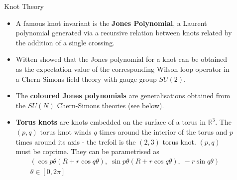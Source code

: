 \documentclass[final,10pt]{beamer}
\newlength{\sepwidth}
\newlength{\colwidth}
\newcommand{\separatorcolumn}{\begin{column}{\sepwidth}\end{column}}
\newcommand{\R}{\mathbb{R}}
\begin{document}
\begin{frame}[t]
\begin{columns}[t]
\begin{column}{\colwidth}
\begin{block}{Knot Theory}
\begin{itemize}
    \item A famous knot invariant is the \textbf{Jones Polynomial}, a Laurent polynomial generated via a recursive relation between knots related by the addition of a single crossing.
    \item Witten showed that the Jones polynomial for a knot can be obtained as the expectation value of the corresponding Wilson loop operator in a Chern-Simons field theory with gauge group $SU(2)$.
    \item The \textbf{coloured Jones polynomials} are generalisations obtained from the $SU(N)$ Chern-Simons theories (see below).
    \item \textbf{Torus knots} are knots embedded on the surface of a torus in $\R^3$. The $(p,q)$ torus knot winds $q$ times around the interior of the torus and $p$ times around its axis - the trefoil is the $(2,3)$ torus knot. $(p,q)$ must be coprime.
    They can be parametrised as \begin{gather}
        \left(\cos p\theta(R+r\cos q\theta),\; \sin p\theta(R+r\cos q\theta),\; -r\sin q\theta\right)\\
        \theta\in {[0,2\pi]}\nonumber
    \end{gather}
\end{itemize}

\end{block}


\end{column}
\separatorcolumn
\begin{column}{\colwidth}


\end{column}
\end{columns}
\end{frame}
\end{document}
